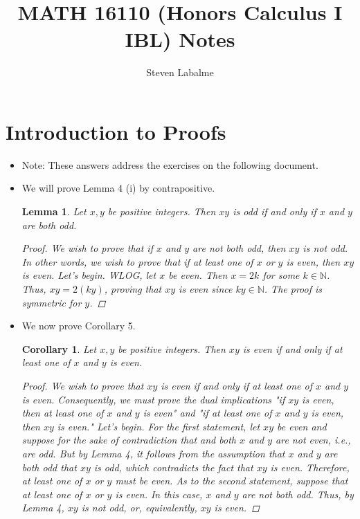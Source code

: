 \documentclass[titlepage]{article}
\title{MATH 16110 (Honors Calculus I IBL) Notes}
\author{Steven Labalme}
\newtheorem{lemma}{Lemma}
\newtheorem{corollary}{Corollary}
\theoremstyle{definition}
\newcommand{\N}{\mathbb{N}}
\begin{document}
\maketitle



\tableofcontents
\newpage



\pagestyle{main}
\renewcommand{\sectionmark}[1]{\markboth{#1}{}}
\section{Introduction to Proofs}
\begin{itemize}
    \item {}Note: These answers address the exercises on the following document.
    \item We will prove Lemma 4 (i) by contrapositive.
    \setcounter{lemma}{3}
    \begin{lemma}
        Let $x,y$ be positive integers. Then $xy$ is odd if and only if $x$ and $y$ are both odd.
        \begin{proof}
            We wish to prove that if $x$ and $y$ are not both odd, then $xy$ is not odd. In other words, we wish to prove that if at least one of $x$ or $y$ is even, then $xy$ is even. Let's begin. WLOG, let $x$ be even. Then $x=2k$ for some $k\in\N$. Thus, $xy=2(ky)$, proving that $xy$ is even since $ky\in\N$. The proof is symmetric for $y$.
        \end{proof}
    \end{lemma}
    \item We now prove Corollary 5.
    \setcounter{corollary}{4}
    \begin{corollary}
        Let $x,y$ be positive integers. Then $xy$ is even if and only if at least one of $x$ and $y$ is even.
        \begin{proof}
            We wish to prove that $xy$ is even if and only if at least one of $x$ and $y$ is even. Consequently, we must prove the dual implications "if $xy$ is even, then at least one of $x$ and $y$ is even" and "if at least one of $x$ and $y$ is even, then $xy$ is even." Let's begin. For the first statement, let $xy$ be even and suppose for the sake of contradiction that and both $x$ and $y$ are not even, i.e., are odd. But by Lemma 4, it follows from the assumption that $x$ and $y$ are both odd that $xy$ is odd, which contradicts the fact that $xy$ is even. Therefore, at least one of $x$ or $y$ must be even. As to the second statement, suppose that at least one of $x$ or $y$ is even. In this case, $x$ and $y$ are not both odd. Thus, by Lemma 4, $xy$ is not odd, or, equivalently, $xy$ is even.

\end{proof}
\end{corollary}
\end{itemize}
\end{document}
